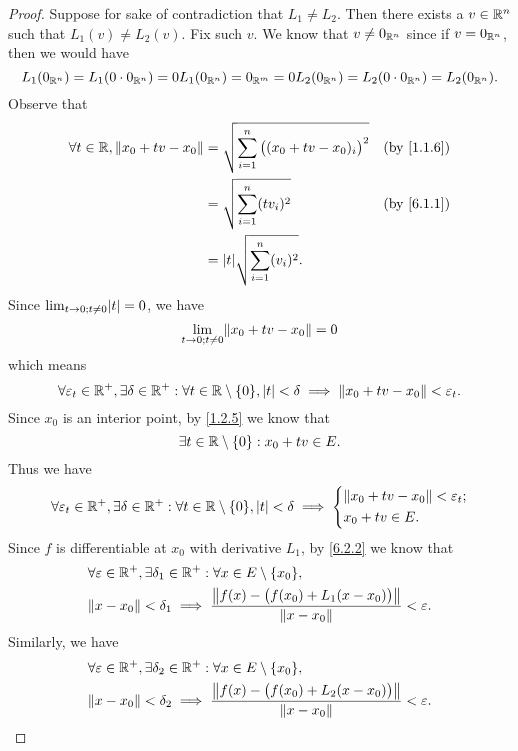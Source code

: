 \begin{proof}
  Suppose for sake of contradiction that \(L_1 \neq L_2\).
  Then there exists a \(v \in \mathbb{R}^n\) such that \(L_1(v) \neq L_2(v)\).
  Fix such \(v\).
  We know that \(v \neq 0_{\mathbb{R}^n}\) since if \(v = 0_{\mathbb{R}^n}\), then we would have
  \[
    L_1(0_{\mathbb{R}^n}) = L_1(0 \cdot 0_{\mathbb{R}^n}) = 0 L_1(0_{\mathbb{R}^n}) = 0_{\mathbb{R}^m} = 0 L_2(0_{\mathbb{R}^n}) = L_2(0 \cdot 0_{\mathbb{R}^n}) = L_2(0_{\mathbb{R}^n}).
  \]
  Observe that
  \begin{align*}
    \forall t \in \R, \norm*{x_0 + tv - x_0} & = \sqrt{\sum_{i = 1}^n \big((x_0 + tv - x_0)_i\big)^2} &  & \by{1.1.6} \\
                                             & = \sqrt{\sum_{i = 1}^n (t v_i)^2}                      &  & \by{6.1.1} \\
                                             & = \abs{t} \sqrt{\sum_{i = 1}^n (v_i)^2}.
  \end{align*}
  Since \(\lim_{t \to 0 ; t \neq 0} \abs{t} = 0\), we have
  \[
    \lim_{t \to 0 ; t \neq 0} \norm*{x_0 + tv - x_0} = 0
  \]
  which means
  \[
    \forall \varepsilon_t \in \R^+, \exists \delta \in \R^+ : \forall t \in \R \setminus \set{0}, \abs{t} < \delta \implies \norm*{x_0 + tv - x_0} < \varepsilon_t.
  \]
  Since \(x_0\) is an interior point, by \cref{1.2.5} we know that
  \[
    \exists t \in \mathbb{R} \setminus \left\lbrace0\right\rbrace : x_0 + tv \in E.
  \]
  Thus we have
  \[
    \forall \varepsilon_t \in \R^+, \exists \delta \in \R^+ : \forall t \in \R \setminus \set{0}, \abs{t} < \delta \implies \begin{dcases}
      \norm*{x_0 + tv - x_0} < \varepsilon_t; \\
      x_0 + tv \in E.
    \end{dcases}
  \]
  Since \(f\) is differentiable at \(x_0\) with derivative \(L_1\), by \cref{6.2.2} we know that
  \begin{align*}
     & \forall \varepsilon \in \R^+, \exists \delta_1 \in \R^+ : \forall x \in E \setminus \set{x_0},                             \\
     & \norm*{x - x_0} < \delta_1 \implies \dfrac{\norm*{f(x) - \big(f(x_0) + L_1(x - x_0)\big)}}{\norm*{x - x_0}} < \varepsilon.
  \end{align*}
  Similarly, we have
  \begin{align*}
     & \forall \varepsilon \in \R^+, \exists \delta_2 \in \R^+ : \forall x \in E \setminus \set{x_0},                             \\
     & \norm*{x - x_0} < \delta_2 \implies \dfrac{\norm*{f(x) - \big(f(x_0) + L_2(x - x_0)\big)}}{\norm*{x - x_0}} < \varepsilon.

\end{align*}
\end{proof}
